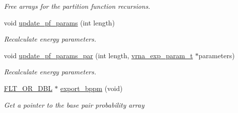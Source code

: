 \begin{DoxyCompactItemize}
\begin{DoxyCompactList}\small\item\em Free arrays for the partition function recursions. \end{DoxyCompactList}\item 
void \hyperlink{group__pf__fold_ga384e927890f9c034ff09fa66da102d28}{update\-\_\-pf\-\_\-params} (int length)
\begin{DoxyCompactList}\small\item\em Recalculate energy parameters. \end{DoxyCompactList}\item 
void \hyperlink{group__pf__fold_gaafe2d1b21f5418b123b088aa395e827d}{update\-\_\-pf\-\_\-params\-\_\-par} (int length, \hyperlink{group__energy__parameters_ga01d8b92fe734df8d79a6169482c7d8d8}{vrna\-\_\-exp\-\_\-param\-\_\-t} $\ast$parameters)
\begin{DoxyCompactList}\small\item\em Recalculate energy parameters. \end{DoxyCompactList}\item 
\hyperlink{group__data__structures_ga31125aeace516926bf7f251f759b6126}{F\-L\-T\-\_\-\-O\-R\-\_\-\-D\-B\-L} $\ast$ \hyperlink{group__pf__fold_gac5ac7ee281aae1c5cc5898a841178073}{export\-\_\-bppm} (void)
\begin{DoxyCompactList}\small\item\em Get a pointer to the base pair probability array


\end{DoxyCompactList}
\end{DoxyCompactItemize}
